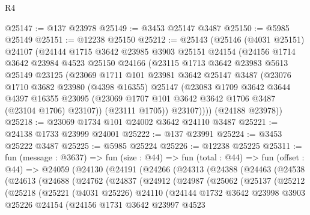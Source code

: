 \begin{lexlean}{R4}
\begin{coremodule}
@25147 := @137 @23978
@25149 := @3453 @25147 @3487
@25150 := @5985 @25149
@25151 := @12238 @25150
@25212 := @25143
    (@25146
      (@4031 @25151)
      @24107
      (@24144
        @1715
        @3642
        @23985
        @3903
        @25151
        @24154
        (@24156
          @1714
          @3642
          @23984
          @4523
          @25150
          @24166
          (@23115
            @1713
            @3642
            @23983
            @5613
            @25149
            @23125
            (@23069
              @1711
              @101
              @23981
              @3642
              @25147
              @3487
              (@23076
                @1710
                @3682
                @23980
                (@4398 @16355)
                @25147
                (@23083
                  @1709
                  @3642
                  @3644
                  @4397
                  @16355
                  @23095
                  (@23069 @1707 @101 @3642 @3642 @1706 @3487 (@23104 @1706) @23107))
                (@23111 @1705))
              @23107))))
      (@24188 @23978))
@25218 := @23069 @1734 @101 @24002 @3642 @24110 @3487
@25221 := @24138 @1733 @23999 @24001
@25222 := @137 @23991
@25224 := @3453 @25222 @3487
@25225 := @5985 @25224
@25226 := @12238 @25225
@25311 := fun (message : @3637) =>
  fun (size : @44) =>
  fun (total : @44) =>
  fun (offset : @44) =>
  @24059
    (@24130
      (@24191
        (@24266
          (@24313
            (@24388
              (@24463
                (@24538
                  (@24613
                    (@24688
                      (@24762
                        (@24837
                          (@24912
                            (@24987
                              (@25062
                                (@25137
                                  (@25212
                                    (@25218
                                      (@25221
                                        (@4031 @25226)
                                        @24110
                                        (@24144
                                          @1732
                                          @3642
                                          @23998
                                          @3903
                                          @25226
                                          @24154
                                          (@24156
                                            @1731
                                            @3642
                                            @23997
                                            @4523

\end{coremodule}
\end{lexlean}
